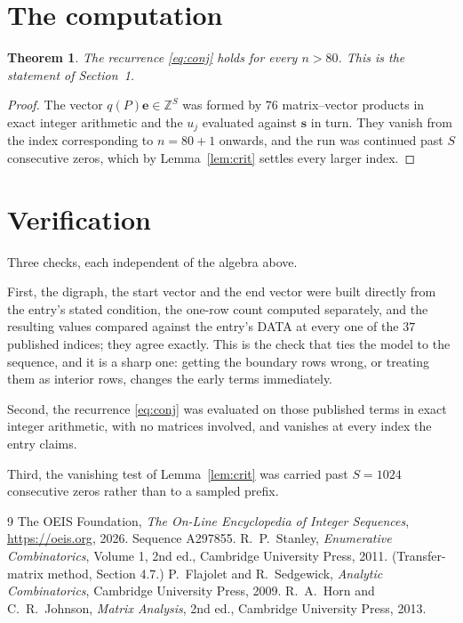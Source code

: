 \documentclass[11pt,a4paper]{article}
\theoremstyle{plain}
\newtheorem{theorem}{Theorem}
\theoremstyle{definition}
\begin{document}
\section{The computation}

\begin{theorem}
The recurrence \eqref{eq:conj} holds for every $n>80$. This is the statement of
Section~1.
\end{theorem}

\begin{proof}
The vector $q(P)\mathbf{e}\in\mathbb{Z}^{S}$ was formed by $76$ matrix--vector
products in exact integer arithmetic and the $u_j$ evaluated against $\mathbf{s}$ in turn.
They vanish from the index corresponding to $n=80+1$ onwards, and the run was continued
past $S$ consecutive zeros, which by Lemma~\ref{lem:crit} settles every larger index.
\end{proof}

\section{Verification}

Three checks, each independent of the algebra above.

First, the digraph, the start vector and the end vector were built directly from the
entry's stated condition, the one-row count computed separately, and the resulting values
compared against the entry's DATA at every one of the $37$ published indices; they
agree exactly. This is the check that ties the model to the sequence, and it is a sharp one:
getting the boundary rows wrong, or treating them as interior rows, changes the early terms
immediately.

Second, the recurrence \eqref{eq:conj} was evaluated on those published terms in exact
integer arithmetic, with no matrices involved, and vanishes at every index the entry claims.

Third, the vanishing test of Lemma~\ref{lem:crit} was carried past $S=1024$ consecutive
zeros rather than to a sampled prefix.

\begin{thebibliography}{9}
 The OEIS Foundation, \emph{The On-Line Encyclopedia of Integer
Sequences}, \url{https://oeis.org}, 2026. Sequence A297855.
 R.~P.~Stanley, \emph{Enumerative Combinatorics}, Volume 1, 2nd ed.,
Cambridge University Press, 2011. (Transfer-matrix method, Section 4.7.)
 P.~Flajolet and R.~Sedgewick, \emph{Analytic Combinatorics}, Cambridge
University Press, 2009.
 R.~A.~Horn and C.~R.~Johnson, \emph{Matrix Analysis}, 2nd ed., Cambridge
University Press, 2013.
\end{thebibliography}
\end{document}
